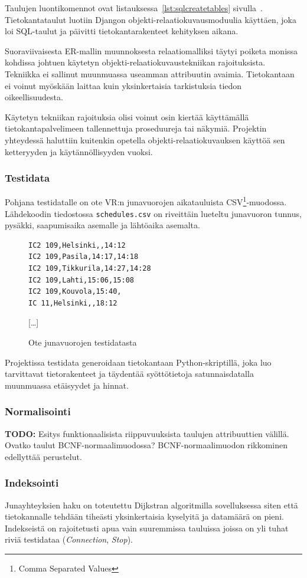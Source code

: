 \documentclass[a4paper,twoside,titlepage,12pt]{article}
\begin{document}
Taulujen luontikomennot ovat listauksessa~\ref{lst:sqlcreatetables} sivulla~\pageref{lst:sqlcreatetables}. Tietokantataulut luotiin Djangon objekti-relaatiokuvausmoduulia käyttäen, joka loi SQL-taulut ja päivitti tietokantarakenteet kehityksen aikana.

Suoraviivaisesta ER-mallin muunnoksesta relaatiomalliksi täytyi poiketa monissa kohdissa johtuen käytetyn objekti-relaatiokuvaustekniikan rajoituksista. Tekniikka ei sallinut muunmuassa useamman attribuutin avaimia. Tietokantaan ei voinut myöskään laittaa kuin yksinkertaisia tarkistuksia tiedon oikeellisuudesta.

Käytetyn tekniikan rajoituksia olisi voinut osin kiertää käyttämällä tietokantapalvelimeen tallennettuja proseduureja tai näkymiä. Projektin yhteydessä haluttiin kuitenkin opetella objekti-relaatiokuvauksen käyttöä sen ketteryyden ja käytännöllisyyden vuoksi.

\subsubsection{Testidata}

Pohjana testidatalle on ote VR:n junavuorojen aikatauluista CSV\footnote{Comma Separated Values}-muodossa. Lähdekoodin tiedostossa \texttt{schedules.csv} on riveittäin lueteltu junavuoron tunnus, pysäkki, saapumisaika asemalle ja lähtöaika asemalta.

\begin{figure}
\begin{lstlisting}
IC2 109,Helsinki,,14:12
IC2 109,Pasila,14:17,14:18
IC2 109,Tikkurila,14:27,14:28
IC2 109,Lahti,15:06,15:08
IC2 109,Kouvola,15:40,
IC 11,Helsinki,,18:12
\end{lstlisting}
[\ldots]
  \caption{Ote junavuorojen testidatasta}
\end{figure}

Projektissa testidata generoidaan tietokantaan Python-skriptillä, joka luo tarvittavat tietorakenteet ja täydentää syöttötietoja satunnaisdatalla muunmuassa etäisyydet ja hinnat.

\subsubsection{Normalisointi}
\textbf{TODO:} Esitys funktionaalisista riippuvuuksista taulujen attribuuttien välillä. Ovatko taulut BCNF-normaalimuodossa? BCNF-normaalimuodon rikkominen edellyttää perustelut. 

\subsubsection{Indeksointi}
Junayhteyksien haku on toteutettu Dijkstran algoritmilla sovelluksessa siten että tietokannalle tehdään tiheästi yksinkertaisia kyselyitä ja datamäärä on pieni. Indekseistä on rajoitetusti apua vain suuremmissa tauluissa joissa on yli tuhat riviä testidataa (\emph{Connection}, \emph{Stop}).
\end{document}
